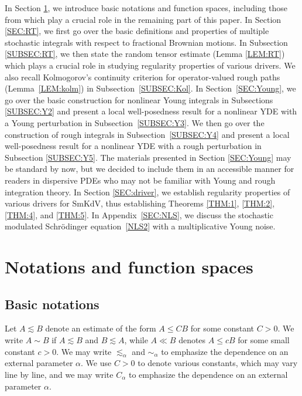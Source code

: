 \documentclass[letterpaper, 11pt,  reqno]{amsart}
\newcommand{\1}{\hspace{0.5mm}\textup{I}\hspace{0.5mm}}
\newcommand{\al}{\alpha}
\newcommand{\les}{\lesssim}
\numberwithin{equation}{section}
\numberwithin{theorem}{section}
\begin{document}
In Section
\ref{SEC:2}, 
we introduce basic notations and function spaces, 
including those from \cite{CGLLO1}
which play a crucial role in the remaining part of this paper.
In Section \ref{SEC:RT}, 
 we first go over the basic definitions and properties of multiple stochastic integrals
 with respect to fractional Brownian motions.
In Subsection \ref{SUBSEC:RT},  
we then state the random tensor estimate (Lemma \ref{LEM:RT})
which plays a crucial role
in studying regularity properties of various drivers.
We also recall 
Kolmogorov's continuity criterion
for operator-valued rough paths
(Lemma~\ref{LEM:kolm})
in Subsection~\ref{SUBSEC:Kol}.
In Section~\ref{SEC:Young}, 
we go over the basic construction 
for nonlinear Young  integrals
in Subsections \ref{SUBSEC:Y2}
and present a local well-posedness
result for a nonlinear YDE with a Young perturbation in 
Subsection~\ref{SUBSEC:Y3}.
We then go over the construction
of rough integrals in 
Subsection~\ref{SUBSEC:Y4}
and present a local well-posedness
result for a nonlinear YDE with a rough perturbation in 
Subsection \ref{SUBSEC:Y5}.
The materials presented in Section \ref{SEC:Young}
may be  standard by now, 
but we decided to include them in an accessible manner
for 
readers in dispersive PDEs who may not be familiar
with Young and rough integration theory.
In 
Section \ref{SEC:driver}, 
we establish regularity properties
of various drivers for SmKdV, 
thus establishing Theorems \ref{THM:1}, 
\ref{THM:2}, \ref{THM:4}, and \ref{THM:5}.
In Appendix~\ref{SEC:NLS}, 
we discuss 
the stochastic modulated Schr\"odinger equation~\eqref{NLS2}
with a multiplicative Young noise.









\section{Notations and function spaces} %
\label{SEC:2}

\subsection{Basic notations}
Let $A\les B$ denote an estimate of the form $A\leq CB$ for some constant $C>0$. We write $A\sim B$ if $A\les B$ and $B\les A$, while $A\ll B$ denotes $A\leq c B$ for some small constant $c> 0$. 
We may write  $\les_{\al}$ and $\sim_{\al}$ to 
emphasize the dependence on an external parameter $\al$.
We use $C>0$ to denote various constants, which may vary line by line, 
and we may write $C_{\al}$
to emphasize 
the dependence on an external parameter $\al$.
\end{document}
